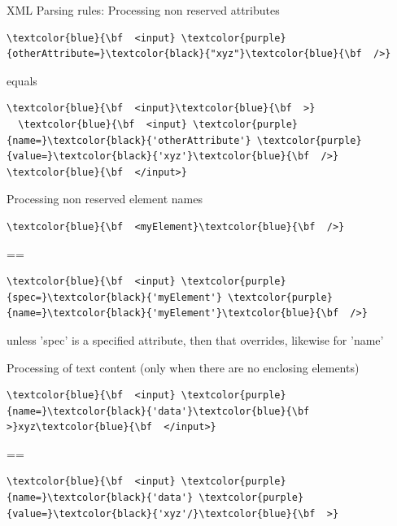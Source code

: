 \documentclass{beamer}
\theoremstyle{definition}
\begin{document}
\begin{frame}[containsverbatim]
{XML}
Parsing rules:
Processing non reserved attributes
\begin{Verbatim}[commandchars=\\\{\}]
\textcolor{blue}{\bf  <input} \textcolor{purple}{otherAttribute=}\textcolor{black}{"xyz"}\textcolor{blue}{\bf  />}
\end{Verbatim}
equals
\begin{Verbatim}[commandchars=\\\{\}]
\textcolor{blue}{\bf  <input}\textcolor{blue}{\bf  >}
  \textcolor{blue}{\bf  <input} \textcolor{purple}{name=}\textcolor{black}{'otherAttribute'} \textcolor{purple}{value=}\textcolor{black}{'xyz'}\textcolor{blue}{\bf  />}
\textcolor{blue}{\bf  </input>}
\end{Verbatim}

Processing non reserved element names
\begin{Verbatim}[commandchars=\\\{\}]
\textcolor{blue}{\bf  <myElement}\textcolor{blue}{\bf  />}
\end{Verbatim}
==
\begin{Verbatim}[commandchars=\\\{\}]
\textcolor{blue}{\bf  <input} \textcolor{purple}{spec=}\textcolor{black}{'myElement'} \textcolor{purple}{name=}\textcolor{black}{'myElement'}\textcolor{blue}{\bf  />}
\end{Verbatim}
unless 'spec' is a specified attribute, then that overrides, likewise for 'name' 


Processing of text content (only when there are no enclosing elements)
\begin{Verbatim}[commandchars=\\\{\}]
\textcolor{blue}{\bf  <input} \textcolor{purple}{name=}\textcolor{black}{'data'}\textcolor{blue}{\bf  >}xyz\textcolor{blue}{\bf  </input>}
\end{Verbatim}
==
\begin{Verbatim}[commandchars=\\\{\}]
\textcolor{blue}{\bf  <input} \textcolor{purple}{name=}\textcolor{black}{'data'} \textcolor{purple}{value=}\textcolor{black}{'xyz'/}\textcolor{blue}{\bf  >}
\end{Verbatim}
\end{frame}

\fi
\end{document}
